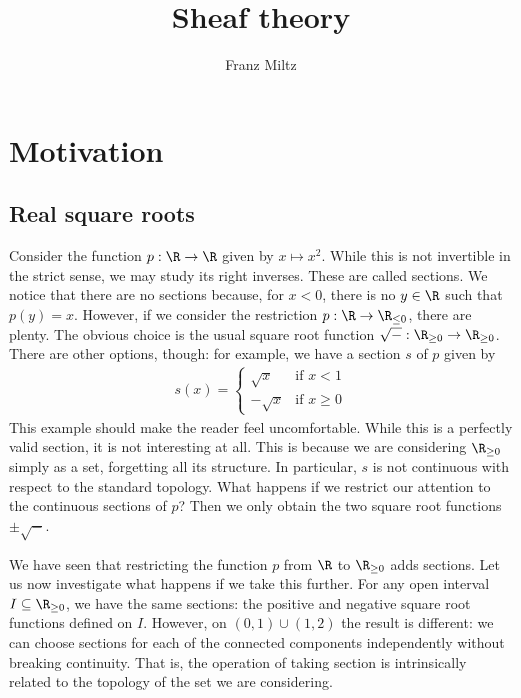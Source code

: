 \documentclass{article}
\author{Franz Miltz}
\title{Sheaf theory}
\begin{document}
\maketitle{}
\tableofcontents
\pagebreak

\section{Motivation}\label{sec:motivation}

\subsection{Real square roots}

Consider the function $p:\R\to\R$ given by $x\mapsto x^2$. While this is
not invertible in the strict sense, we may study its right inverses.
These are called sections. We notice that there are no sections because,
for $x < 0$, there is no $y\in\R$ such that $p(y) = x$. However,
if we consider the restriction $p:\R\to\R_{\leq 0}$, there are plenty.
The obvious choice is the usual square root function
$\sqrt{-} : \R_{\geq 0} \to \R_{\geq 0}$. There are other options, though:
for example, we have a section $s$ of $p$ given by
\begin{align*}
  s(x) = \begin{cases}
    \sqrt{x} & \text{if }x<1 \\
    -\sqrt{x} & \text{if }x\geq 0
  \end{cases}
\end{align*}
This example should make the reader feel uncomfortable. While this is
a perfectly valid section, it is not interesting at all. This is because
we are considering $\R_{\geq 0}$ simply as a set, forgetting all its
structure. In particular, $s$ is not continuous with respect to the
standard topology.
What happens if we restrict our attention to the continuous sections
of $p$? Then we only obtain the two square root functions $\pm\sqrt{-}$.

We have seen that restricting the function $p$ from $\R$ to $\R_{\geq 0}$
adds sections. Let us now investigate what happens if we take this further.
For any open interval $I\subseteq\R_{\geq 0}$, we have the same sections:
the positive and negative square root functions defined on $I$. However,
on $(0,1)\cup(1,2)$ the result is different: we can choose sections for
each of the connected components independently without breaking continuity.
That is, the operation of taking section is intrinsically related to
the topology of the set we are considering.
\end{document}
